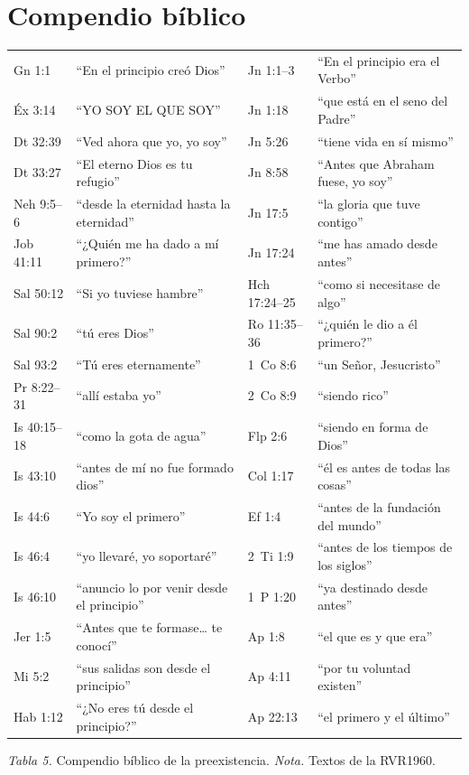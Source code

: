 \documentclass[11pt,letterpaper]{article}
\begin{document}
\section*{Compendio bíblico}
\begin{center}\small\renewcommand{\arraystretch}{1.12}
\begin{tabular}{@{}L{2.2cm}L{5.0cm}|L{2.2cm}L{5.0cm}@{}}
\toprule
Gn 1:1 & ``En el principio creó Dios'' & Jn 1:1--3 & ``En el principio era el Verbo'' \\
Éx 3:14 & ``YO SOY EL QUE SOY'' & Jn 1:18 & ``que está en el seno del Padre'' \\
Dt 32:39 & ``Ved ahora que yo, yo soy'' & Jn 5:26 & ``tiene vida en sí mismo'' \\
Dt 33:27 & ``El eterno Dios es tu refugio'' & Jn 8:58 & ``Antes que Abraham fuese, yo soy'' \\
Neh 9:5--6 & ``desde la eternidad hasta la eternidad'' & Jn 17:5 & ``la gloria que tuve contigo'' \\
Job 41:11 & ``¿Quién me ha dado a mí primero?'' & Jn 17:24 & ``me has amado desde antes'' \\
Sal 50:12 & ``Si yo tuviese hambre'' & Hch 17:24--25 & ``como si necesitase de algo'' \\
Sal 90:2 & ``tú eres Dios'' & Ro 11:35--36 & ``¿quién le dio a él primero?'' \\
Sal 93:2 & ``Tú eres eternamente'' & 1~Co 8:6 & ``un Señor, Jesucristo'' \\
Pr 8:22--31 & ``allí estaba yo'' & 2~Co 8:9 & ``siendo rico'' \\
Is 40:15--18 & ``como la gota de agua'' & Flp 2:6 & ``siendo en forma de Dios'' \\
Is 43:10 & ``antes de mí no fue formado dios'' & Col 1:17 & ``él es antes de todas las cosas'' \\
Is 44:6 & ``Yo soy el primero'' & Ef 1:4 & ``antes de la fundación del mundo'' \\
Is 46:4 & ``yo llevaré, yo soportaré'' & 2~Ti 1:9 & ``antes de los tiempos de los siglos'' \\
Is 46:10 & ``anuncio lo por venir desde el principio'' & 1~P 1:20 & ``ya destinado desde antes'' \\
Jer 1:5 & ``Antes que te formase\ldots{} te conocí'' & Ap 1:8 & ``el que es y que era'' \\
Mi 5:2 & ``sus salidas son desde el principio'' & Ap 4:11 & ``por tu voluntad existen'' \\
Hab 1:12 & ``¿No eres tú desde el principio?'' & Ap 22:13 & ``el primero y el último'' \\
\bottomrule
\end{tabular}\par
{\footnotesize\color{gris}\textit{Tabla 5.} Compendio bíblico de la preexistencia. \textit{Nota.} Textos de la RVR1960.}
\end{center}
\end{document}
